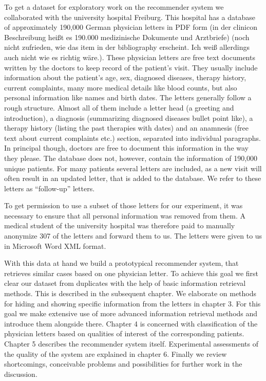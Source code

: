 To get a dataset for exploratory work on the recommender system we collaborated with the university hospital Freiburg. This hospital has a database of approximately 190,000 German
physician letters in PDF form \citep{spadaro2012} (in der clinicon Beschreibung heißt es 190.000 medizinische Dokumente und Arztbriefe) (noch nicht zufrieden, wie das item in der bibliography erscheint. Ich weiß allerdings auch nicht wie es richtig wäre.). These physician letters are free text documents
written by the doctors to keep record of the patient's visit. They
usually include information about the patient's age, sex, diagnosed
diseases, therapy history, current complaints, many more medical details
like blood counts, but also personal information like names and birth dates.
The letters generally follow a rough structure. Almost all of them include a letter head (a greeting and introduction), a diagnosis (summarizing diagnosed diseases bullet point like), a therapy history (listing the past therapies with dates) and an anamnesis (free text about current complaints etc.) section, separated into individual paragraphs. In principal though, doctors are free to document this information in the way they please. The database does not, however, contain the information of 190,000 unique patients. For many patients several letters are included, as a new visit will often result in an updated letter, that is added to the database. We refer to these letters as ``follow-up'' letters.

To get permission to use a subset of those letters for our experiment, it was necessary to ensure that all personal information was removed from them. A medical student of the university hospital was therefore paid to manually anonymize 307 of the letters and forward them to us. The letters were given to us in Microsoft Word XML format.

With this data at hand we build a prototypical recommender system, that retrieves similar cases based on one physician letter. To achieve this goal we first clear our dataset from duplicates with the help of basic information retrieval methods. This is described in the subsequent chapter. We elaborate on methods for hiding and showing specific information from the letters in chapter 3. For this goal we make extensive use of more advanced information retrieval methods and introduce them alongside there. Chapter 4 is concerned with classification of the physician letters based on qualities of interest of the corresponding patients. Chapter 5 describes the recommender system itself. Experimental assessments of the quality of the system are explained in chapter 6. Finally we review shortcomings, conceivable problems and possibilities for further work in the discussion.

